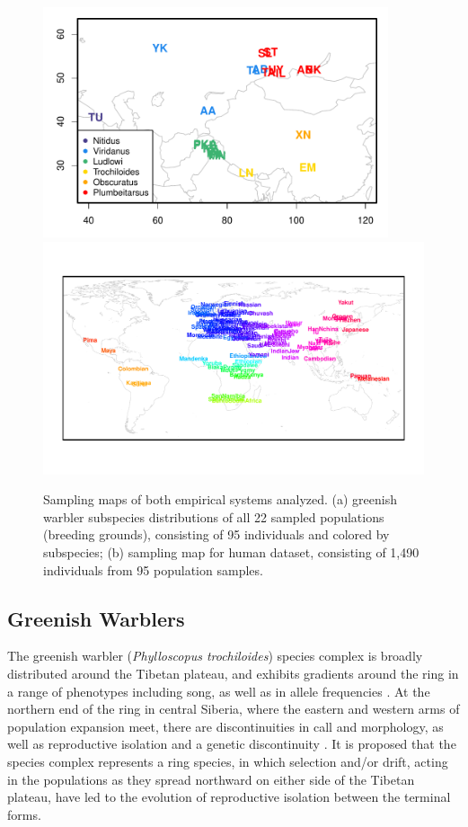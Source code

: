 \documentclass[12pt]{article}
\begin{document}
\begin{figure}
	\centering
			{\includegraphics[width=4in,height=2.67in]{figs/warblers/warbler_sampling_map.pdf}}
			{\includegraphics[width=\textwidth,height=0.6\textwidth]{figs/globetrotter/globe_world_map_text.pdf}}
            \caption{Sampling maps of both empirical systems analyzed.  (a) greenish warbler subspecies distributions of all 22 sampled populations (breeding grounds), consisting of 95 individuals and colored by subspecies; (b) sampling map for human dataset, consisting of 1,490 individuals from 95 population samples.}
\label{sfig:empirical_maps}
\end{figure}


\subsection*{Greenish Warblers}  

The greenish warbler (\textit{Phylloscopus trochiloides}) species complex is broadly distributed around the Tibetan plateau, and exhibits gradients around the ring in a range of phenotypes including song, as well as in allele frequencies \citep{ticehurst1938, Irwin2001, Irwin2005}.  At the northern end of the ring in central Siberia, where the eastern and western arms of population expansion meet, there are discontinuities in call and morphology, as well as reproductive isolation and a genetic discontinuity \citep{Irwin2001, Irwin2008}. It is proposed that the species complex represents a ring species, in which selection and/or drift, acting in the populations as they spread northward on either side of the Tibetan plateau, have led to the evolution of reproductive isolation between the terminal forms.
\end{document}
